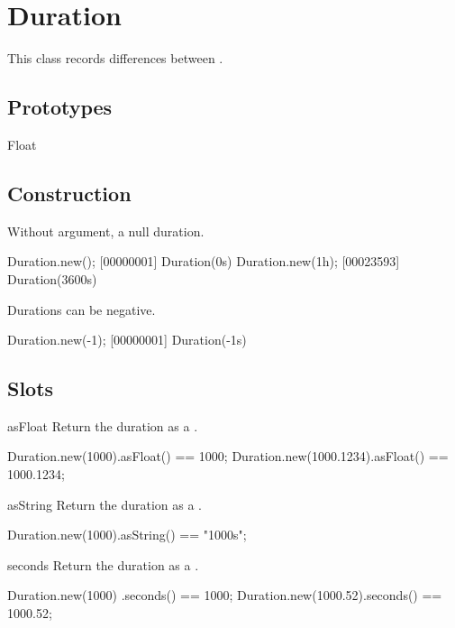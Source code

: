 
\section{Duration}

This class records differences between .
\experimental{}

\subsection{Prototypes}
\begin{refObjects}
\item[Float]
\end{refObjects}

\subsection{Construction}

Without argument, a null duration.

\begin{urbiscript}[firstnumber=1]
Duration.new();
[00000001] Duration(0s)
Duration.new(1h);
[00023593] Duration(3600s)
\end{urbiscript}

Durations can be negative.

\begin{urbiscript}
Duration.new(-1);
[00000001] Duration(-1s)
\end{urbiscript}


\subsection{Slots}

\begin{urbiscriptapi}
\item[asFloat]
  Return the duration as a .
\begin{urbiassert}
Duration.new(1000).asFloat() == 1000;
Duration.new(1000.1234).asFloat() == 1000.1234;
\end{urbiassert}


\item[asString]
  Return the duration as a .
\begin{urbiassert}
Duration.new(1000).asString() == "1000s";
\end{urbiassert}


\item[seconds]
  Return the duration as a .
\begin{urbiassert}
Duration.new(1000)   .seconds() == 1000;
Duration.new(1000.52).seconds() == 1000.52;
\end{urbiassert}
\end{urbiscriptapi}


